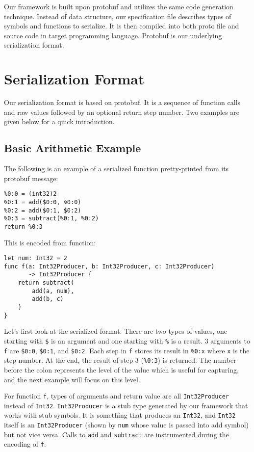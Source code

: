 \documentclass[12pt]{article}
\begin{document}
Our framework is built upon protobuf and utilizes the same code generation technique. Instead of data structure, our specification file describes types of symbols and functions to serialize. It is then compiled into both proto file and source code in target programming language. Protobuf is our underlying serialization format.

\section{Serialization Format}
Our serialization format is based on protobuf. It is a sequence of function calls and raw values followed by an optional return step number. Two examples are given below for a quick introduction.

\subsection{Basic Arithmetic Example}
The following is an example of a serialized function pretty-printed from its protobuf message:
\begin{lstlisting}
%0:0 = (int32)2
%0:1 = add($0:0, %0:0)
%0:2 = add($0:1, $0:2)
%0:3 = subtract(%0:1, %0:2)
return %0:3
\end{lstlisting}
This is encoded from function:
\begin{lstlisting}
let num: Int32 = 2
func f(a: Int32Producer, b: Int32Producer, c: Int32Producer)
       -> Int32Producer {
    return subtract(
        add(a, num),
        add(b, c)
    )
}
\end{lstlisting}
Let's first look at the serialized format. There are two types of values, one starting with \texttt{\$} is an argument and one starting with \texttt{\%} is a result. 3 arguments to \texttt{f} are \texttt{\$0:0}, \texttt{\$0:1}, and \texttt{\$0:2}. Each step in \texttt{f} stores its result in \texttt{\%0:x} where \texttt{x} is the step number. At the end, the result of step 3 (\texttt{\%0:3}) is returned. The number before the colon represents the level of the value which is useful for capturing, and the next example will focus on this level.

For function \texttt{f}, types of arguments and return value are all \texttt{Int32Producer} instead of \texttt{Int32}. \texttt{Int32Producer} is a stub type generated by our framework that works with stub symbols. It is something that produces an \texttt{Int32}, and \texttt{Int32} itself is an \texttt{Int32Producer} (shown by \texttt{num} whose value is passed into add symbol) but not vice versa. Calls to \texttt{add} and \texttt{subtract} are instrumented during the encoding of \texttt{f}.
\end{document}
